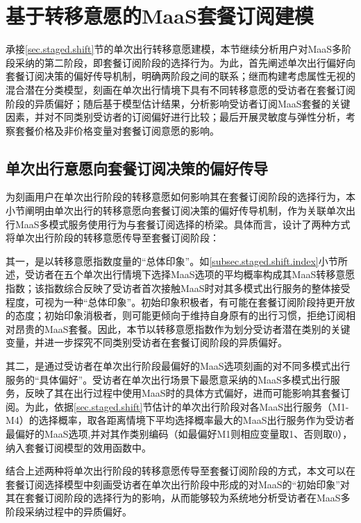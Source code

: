 \section{基于转移意愿的MaaS套餐订阅建模}\label{sec.staged.bundle}

承接\ref{sec.staged.shift}节的单次出行转移意愿建模，本节继续分析用户对MaaS多阶段采纳的第二阶段，即套餐订阅阶段的选择行为。为此，首先阐述单次出行偏好向套餐订阅决策的偏好传导机制，明确两阶段之间的联系；继而构建考虑属性无视的混合潜在分类模型，刻画在单次出行情境下具有不同转移意愿的受访者在套餐订阅阶段的异质偏好；随后基于模型估计结果，分析影响受访者订阅MaaS套餐的关键因素，并对不同类别受访者的订阅偏好进行比较；最后开展灵敏度与弹性分析，考察套餐价格及非价格变量对套餐订阅意愿的影响。

\subsection{单次出行意愿向套餐订阅决策的偏好传导}\label{subsec.staged.bundle.mechanism}

为刻画用户在单次出行阶段的转移意愿如何影响其在套餐订阅阶段的选择行为，本小节阐明由单次出行的转移意愿向套餐订阅决策的偏好传导机制，作为关联单次出行MaaS多模式服务使用行为与套餐订阅选择的桥梁。具体而言，设计了两种方式将单次出行阶段的转移意愿传导至套餐订阅阶段：

其一，是以转移意愿指数度量的``总体印象''。如\ref{subsec.staged.shift.index}小节所述，受访者在五个单次出行情境下选择MaaS选项的平均概率构成其MaaS转移意愿指数；该指数综合反映了受访者首次接触MaaS时对其多模式出行服务的整体接受程度，可视为一种``总体印象''。初始印象积极者，有可能在套餐订阅阶段持更开放的态度；初始印象消极者，则可能更倾向于维持自身原有的出行习惯，拒绝订阅相对昂贵的MaaS套餐。因此，本节以转移意愿指数作为划分受访者潜在类别的关键变量，并进一步探究不同类别受访者在套餐订阅阶段的异质偏好。

其二，是通过受访者在单次出行阶段最偏好的MaaS选项刻画的对不同多模式出行服务的``具体偏好''。受访者在单次出行场景下最愿意采纳的MaaS多模式出行服务，反映了其在出行过程中使用MaaS时的具体方式偏好，进而可能影响其套餐订阅。为此，依据\ref{sec.staged.shift}节估计的单次出行阶段对各MaaS出行服务（M1-M4）的选择概率，取各距离情境下平均选择概率最大的MaaS出行服务作为受访者最偏好的MaaS选项,并对其作类别编码（如最偏好M1则相应变量取1、否则取0），纳入套餐订阅模型的效用函数中。

结合上述两种将单次出行阶段的转移意愿传导至套餐订阅阶段的方式，本文可以在套餐订阅选择模型中刻画受访者在单次出行阶段中形成的对MaaS的``初始印象''对其在套餐订阅阶段的选择行为的影响，从而能够较为系统地分析受访者在MaaS多阶段采纳过程中的异质偏好。

